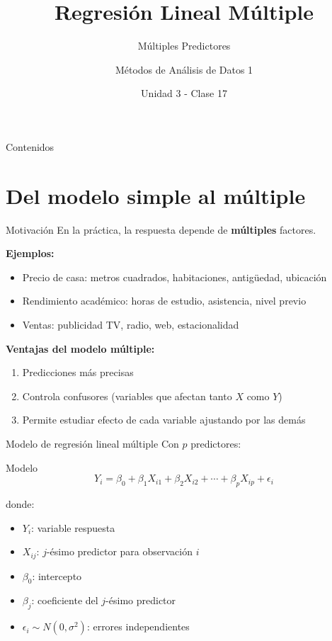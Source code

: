 \documentclass[aspectratio=169]{beamer}
\title{Regresión Lineal Múltiple}
\subtitle{Múltiples Predictores}
\author{Métodos de Análisis de Datos 1}
\institute{Universidad Nacional del Sur}
\date{Unidad 3 - Clase 17}
\begin{document}
\frame{\titlepage}

\begin{frame}{Contenidos}
\tableofcontents
\end{frame}

\section{Del modelo simple al múltiple}

\begin{frame}{Motivación}
En la práctica, la respuesta depende de \textbf{múltiples} factores.

\vspace{0.3cm}
\textbf{Ejemplos:}
\begin{itemize}
    \item Precio de casa: metros cuadrados, habitaciones, antigüedad, ubicación
    \item Rendimiento académico: horas de estudio, asistencia, nivel previo
    \item Ventas: publicidad TV, radio, web, estacionalidad
\end{itemize}

\vspace{0.5cm}
\textbf{Ventajas del modelo múltiple:}
\begin{enumerate}
    \item Predicciones más precisas
    \item Controla confusores (variables que afectan tanto $X$ como $Y$)
    \item Permite estudiar efecto de cada variable ajustando por las demás
\end{enumerate}
\end{frame}

\begin{frame}{Modelo de regresión lineal múltiple}
Con $p$ predictores:

\begin{block}{Modelo}
\[
Y_i = \beta_0 + \beta_1 X_{i1} + \beta_2 X_{i2} + \cdots + \beta_p X_{ip} + \epsilon_i
\]
\end{block}

donde:
\begin{itemize}
    \item $Y_i$: variable respuesta
    \item $X_{ij}$: $j$-ésimo predictor para observación $i$
    \item $\beta_0$: intercepto
    \item $\beta_j$: coeficiente del $j$-ésimo predictor
    \item $\epsilon_i \sim N(0, \sigma^2)$: errores independientes
\end{itemize}
\end{frame}
\end{document}
